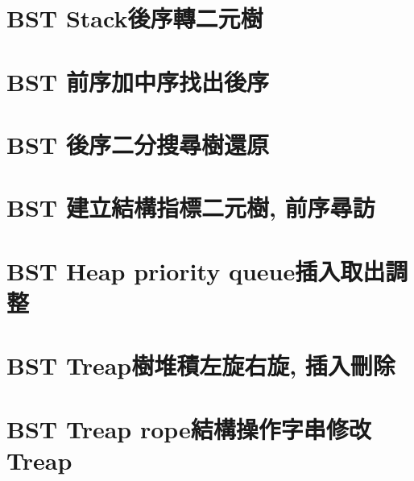 \documentclass{article}
\begin{document}
\begin{multicols}{2}
\section{BST Stack後序轉二元樹}



\section{BST 前序加中序找出後序}



\section{BST 後序二分搜尋樹還原}



\section{BST 建立結構指標二元樹, 前序尋訪}



\section{BST Heap priority queue插入取出調整}



\section{BST Treap樹堆積左旋右旋, 插入刪除}



\section{BST Treap rope結構操作字串修改Treap}




\end{multicols}
\end{document}
